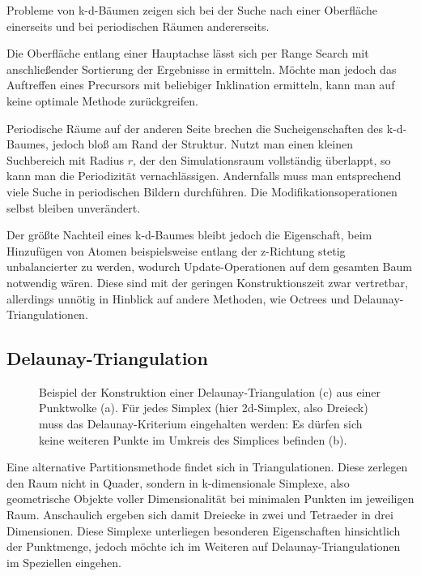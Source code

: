 Probleme von k-d-Bäumen zeigen sich bei der Suche nach einer Oberfläche einerseits und bei periodischen Räumen andererseits.

Die Oberfläche entlang einer Hauptachse lässt sich per Range Search mit anschließender Sortierung der Ergebnisse in  ermitteln.
Möchte man jedoch das Auftreffen eines Precursors mit beliebiger Inklination ermitteln, kann man auf keine optimale Methode zurückgreifen.

Periodische Räume auf der anderen Seite brechen die Sucheigenschaften des k-d-Baumes, jedoch bloß am Rand der Struktur.
Nutzt man einen kleinen Suchbereich mit Radius $r$, der den Simulationsraum vollständig überlappt, so kann man die Periodizität vernachlässigen.
Andernfalls muss man entsprechend viele Suche in periodischen Bildern durchführen.
Die Modifikationsoperationen selbst bleiben unverändert.

Der größte Nachteil eines k-d-Baumes bleibt jedoch die Eigenschaft, beim Hinzufügen von Atomen beispielsweise entlang der z-Richtung stetig unbalancierter zu werden, wodurch Up\-date-Opera\-tionen auf dem gesamten Baum notwendig wären.
Diese sind mit der geringen Konstruktionszeit zwar vertretbar, allerdings unnötig in Hinblick auf andere Methoden, wie Octrees und Delaunay-Triangulationen.

\subsection{Delaunay-Triangulation}

\begin{figure}[bhpt]
  \centering
  \def\svgwidth{\textwidth}
  
  \caption[Delaunay-Triangulation]{Beispiel der Konstruktion einer Delaunay-Triangulation (c) aus einer Punktwolke (a).
    Für jedes Simplex (hier 2d-Simplex, also Dreieck) muss das Delaunay-Kriterium eingehalten werden:
    Es dürfen sich keine weiteren Punkte im Umkreis des Simplices befinden (b).
  }
  \label{fig:delaunay}
\end{figure}

Eine alternative Partitionsmethode findet sich in Triangulationen.
Diese zerlegen den Raum nicht in Quader, sondern in k-dimensionale Simplexe, also geometrische Objekte voller Dimensionalität bei minimalen Punkten im jeweiligen Raum.
Anschaulich ergeben sich damit Dreiecke in zwei und Tetraeder in drei Dimensionen.
Diese Simplexe unterliegen besonderen Eigenschaften hinsichtlich der Punktmenge, jedoch möchte ich im Weiteren auf Delaunay-Triangulationen im Speziellen eingehen.

